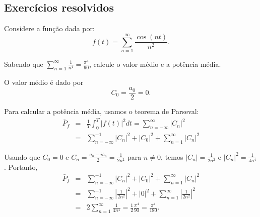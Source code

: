 \subsection*{Exercícios resolvidos}
\begin{exeresol}
    Considere a função dada por:
$$
f(t)=\sum_{n=1}^\infty \frac{\cos(nt)}{n^2}.
$$

Sabendo que $\sum_{n=1}^\infty \frac{1}{n^4}=\frac{\pi^4}{90}$, calcule o valor médio e a potência média.
\end{exeresol}
\begin{resol}
O valor médio é dado por
$$
C_0=\frac{a_0}{2}=0.
$$ 

Para calcular a potência média, usamos o teorema de Parseval:
\begin{eqnarray*}
\bar{P}_f &=& \frac{1}{T}\int_0^T|f(t)|^2dt=\sum_{n=-\infty}^\infty |C_n|^2\\
&=&\sum_{n=-\infty}^{-1} |C_n|^2 + |C_0|^2 + \sum_{n=1}^\infty |C_n|^2
\end{eqnarray*}

Usando que $C_0=0$ e $C_n=\frac{a_n-ib_n}{2}=\frac{1}{2n^2}$ para $n\neq 0$, temos $|C_n|=\frac{1}{2n^2}$ e $|C_n|^2=\frac{1}{4n^4}$. Portanto,
\begin{eqnarray*}
\bar{P}_f
&=&\sum_{n=-\infty}^{-1} |C_n|^2 + |C_0|^2 + \sum_{n=1}^\infty |C_n|^2\\
&=&\sum_{n=-\infty}^{-1} \left|\frac{1}{2n^2}\right|^2 + |0|^2 + \sum_{n=1}^\infty \left|\frac{1}{2n^2}\right|^2\\
&=&2\sum_{n=1}^\infty \frac{1}{4n^4}=\frac{1}{2}\frac{\pi^4}{90}=\frac{\pi^4}{180}.
\end{eqnarray*}

\end{resol}


